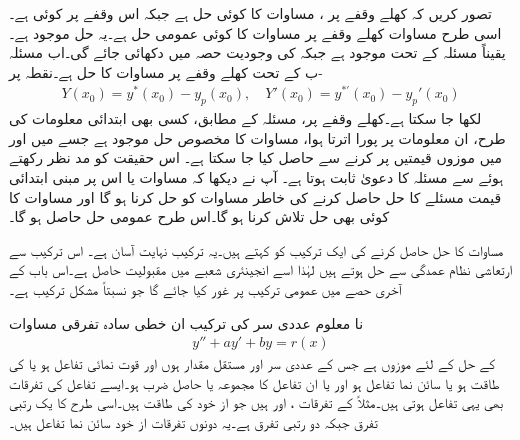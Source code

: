تصور کریں کہ کھلے وقفے  پر ،  مساوات  کا کوئی حل ہے جبکہ  اس وقفے پر کوئی  ہے۔اسی طرح مساوات  کھلے وقفے پر مساوات  کا کوئی عمومی حل ہے۔یہ حل موجود ہے۔یقیناً  مسئلہ  کے تحت موجود ہے جبکہ  کی وجودیت حصہ  میں  دکھائی جائے گی۔اب مسئلہ -ب کے تحت   کھلے وقفے پر مساوات  کا حل ہے۔نقطہ  پر
\begin{align*}
Y(x_0)=y^*(x_0)-y_p(x_0), \quad Y'(x_0)=y^{*'}(x_0)-y_p'(x_0)
\end{align*}
لکھا جا سکتا ہے۔کھلے وقفے   پر، مسئلہ  کے مطابق، کسی بھی ابتدائی معلومات کی طرح، ان معلومات پر پورا اترتا ہوا، مساوات  کا مخصوص حل موجود ہے جسے  میں  اور  میں موزوں  قیمتیں پر کرنے سے حاصل کیا جا سکتا ہے۔  اس حقیقت کو مد نظر رکھتے ہوئے   سے مسئلہ کا دعویٰ ثابت ہوتا ہے۔
آپ نے دیکھا کہ مساوات  یا اس پر مبنی ابتدائی قیمت مسئلے کا حل  حاصل کرنے کی خاطر مساوات  کو حل کرنا ہو گا اور مساوات  کا کوئی بھی حل   تلاش کرنا ہو گا۔اس طرح عمومی حل  حاصل ہو گا۔

مساوات  کا حل  حاصل کرنے کی ایک ترکیب کو   کہتے ہیں۔یہ ترکیب نہایت آسان ہے۔ اس ترکیب سے ارتعاشی نظام عمدگی سے حل ہوتے ہیں لہٰذا اسے انجینئری شعبے میں مقبولیت حاصل ہے۔اس باب کے آخری حصے میں عمومی ترکیب پر غور کیا جائے گا جو نسبتاً مشکل ترکیب ہے۔

نا معلوم عددی سر کی ترکیب ان خطی سادہ تفرقی مساوات
\begin{align}\label{مساوات_سادہ_دو_نا_معلوم_الف}
y''+ay'+by=r(x)
\end{align}
 کے حل کے لئے موزوں ہے جس کے عددی سر  اور  مستقل مقدار ہوں اور  قوت نمائی تفاعل ہو یا  کی طاقت ہو یا  سائن نما تفاعل ہو اور یا ان تفاعل کا مجموعہ یا حاصل ضرب ہو۔ایسے تفاعل کی تفرقات بھی یہی تفاعل ہوتی ہیں۔مثلاً  کے تفرقات   ،  اور  ہیں جو از خود  کی طاقت ہیں۔اسی طرح  کا یک رتبی تفرق  جبکہ دو رتبی تفرق  ہے۔یہ دونوں تفرقات از خود  سائن نما تفاعل ہیں۔


